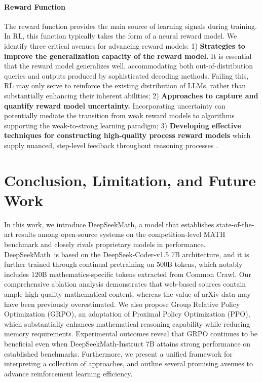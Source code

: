 \begin{itemize}[topsep=0pt]
\paragraph{Reward Function} The reward function provides the main source of learning signals during training. In RL, this function typically takes the form of a neural reward model. We identify three critical avenues for advancing reward models: 1) \textbf{Strategies to improve the generalization capacity of the reward model.} It is essential that the reward model generalizes well, accommodating both out-of-distribution queries and outputs produced by sophisticated decoding methods. Failing this, RL may only serve to reinforce the existing distribution of LLMs, rather than substantially enhancing their inherent abilities; 2) \textbf{Approaches to capture and quantify reward model uncertainty.} Incorporating uncertainty can potentially mediate the transition from weak reward models to algorithms supporting the weak-to-strong learning paradigm; 3) \textbf{Developing effective techniques for constructing high-quality process reward models} which supply nuanced, step-level feedback throughout reasoning processes \citep{lightman2023let,wang2023math}.

\section{Conclusion, Limitation, and Future Work} In this work, we introduce DeepSeekMath, a model that establishes state-of-the-art results among open-source systems on the competition-level MATH benchmark and closely rivals proprietary models in performance. DeepSeekMath~is based on the DeepSeek-Coder-v1.5 7B architecture, and it is further trained through continual pretraining on 500B tokens, which notably includes 120B mathematics-specific tokens extracted from Common Crawl. Our comprehensive ablation analysis demonstrates that web-based sources contain ample high-quality mathematical content, whereas the value of arXiv data may have been previously overestimated. We also propose Group Relative Policy Optimization (GRPO), an adaptation of Proximal Policy Optimization (PPO), which substantially enhances mathematical reasoning capability while reducing memory requirements. Experimental outcomes reveal that GRPO continues to be beneficial even when DeepSeekMath-Instruct 7B attains strong performance on established benchmarks. Furthermore, we present a unified framework for interpreting a collection of approaches, and outline several promising avenues to advance reinforcement learning efficiency.


\end{itemize}
